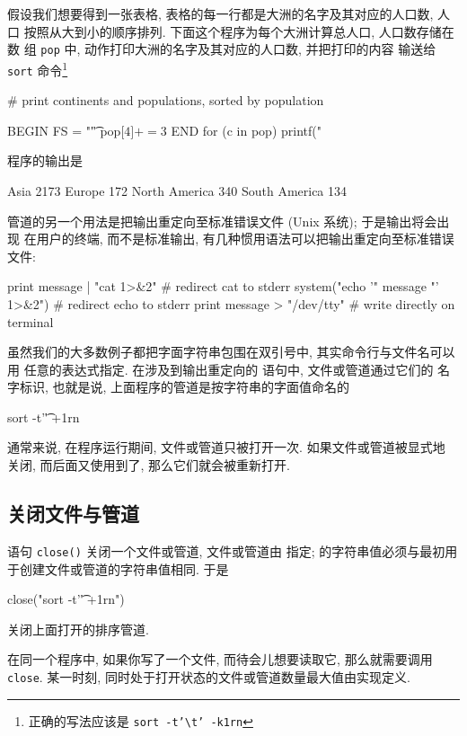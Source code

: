 假设我们想要得到一张表格, 表格的每一行都是大洲的名字及其对应的人口数, 人口
按照从大到小的顺序排列. 下面这个程序为每个大洲计算总人口, 人口数存储在数
组 \verb'pop' 中, \END 动作打印大洲的名字及其对应的人口数, 并把打印的内容
输送给 \verb'sort' 命令\footnote{正确的写法应该是 \texttt{sort
-t'}\texttt{\textbackslash}\texttt{t' -k1rn}}
\begin{myverb}
    # print continents and populations, sorted by population

    BEGIN { FS = "\t" }
          { pop[$4] += $3 }
    END   { for (c in pop)
              printf("%
          }
\end{myverb}
程序的输出是
\begin{myverb}
           Asia	  2173
         Europe	   172
  North America	   340
  South America	   134
\end{myverb}

管道的另一个用法是把输出重定向至标准错误文件 (Unix 系统); 于是输出将会出现
在用户的终端, 而不是标准输出, 有几种惯用语法可以把输出重定向至标准错误文件:
\begin{myverb}
    print message | "cat 1>&2"          # redirect cat to stderr
    system("echo '" message "' 1>&2")   # redirect echo to stderr
    print message > "/dev/tty"          # write directly on terminal
\end{myverb}

虽然我们的大多数例子都把字面字符串包围在双引号中, 其实命令行与文件名可以用
任意的表达式指定. 在涉及到输出重定向的 \print 语句中, 文件或管道通过它们的
名字标识, 也就是说, 上面程序的管道是按字符串的字面值命名的
\begin{myverb}
    sort -t'\t' +1rn
\end{myverb}
通常来说, 在程序运行期间, 文件或管道只被打开一次. 如果文件或管道被显式地
关闭, 而后面又使用到了, 那么它们就会被重新打开.

\subsection{关闭文件与管道}
\label{subsec:closing_files_and_pipes}

语句 \verb'close('\expr\verb')' 关闭一个文件或管道, 文件或管道由
\expr 指定; \expr 的字符串值必须与最初用于创建文件或管道的字符串值相同.
于是
\begin{myverb}
    close("sort -t'\t' +1rn")
\end{myverb}
关闭上面打开的排序管道.

在同一个程序中, 如果你写了一个文件, 而待会儿想要读取它, 那么就需要调用
\verb'close'. 某一时刻, 同时处于打开状态的文件或管道数量最大值由实现定义.

